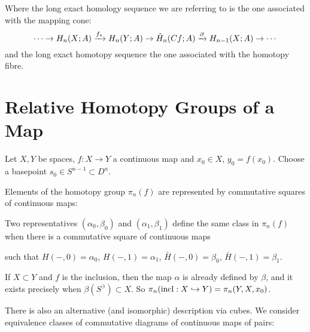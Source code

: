 Where the long exact homology sequence we are referring to is the one associated with the mapping cone:
\[\cdots\to H_n(X;A)\xrightarrow{f_*} H_n(Y;A)\to \tilde H_n(Cf;A)\xrightarrow{\partial} H_{n-1}(X;A)\to\cdots\]
and the long exact homotopy sequence the one associated with the homotopy fibre.

\section{Relative Homotopy Groups of a Map}

Let $X,Y$ be spaces, $f:X\to Y$ a continuous map and $x_0\in X$, $y_0=f(x_0)$. Choose a basepoint $s_0\in S^{n-1}\subset D^n$.

Elements of the homotopy group $\pi_n(f)$ are represented by commutative squares of continuous maps:
\begin{center}
\end{center}

Two representatives $(\alpha_0,\beta_0)$ and $(\alpha_1,\beta_1)$ define the same class in $\pi_n(f)$ when there is a commutative square of continuous maps
\begin{center}
\end{center}
such that $H(-,0)=\alpha_0$, $H(-,1)=\alpha_1$, $\bar H(-,0)=\beta_0$, $\bar H(-,1)=\beta_1$.

If $X\subset Y$ and $f$ is the inclusion, then the map $\alpha$ is already defined by $\beta$, and it exists precisely when $\beta(S^\ni)\subset X$. So $\pi_n(\operatorname{incl}:X\hookrightarrow Y)=\pi_n(Y,X,x_0)$.

There is also an alternative (and isomorphic) description via cubes. We consider equivalence classes of commutative diagrams of continuous maps of pairs:
\begin{center}
\end{center}

